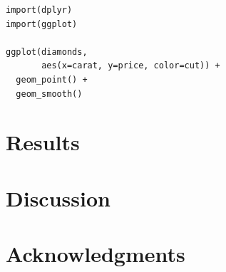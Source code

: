 \documentclass[fleqn,moreauthors,10pt]{ds_report}
\begin{document}
\lstset{language=Python}


\lstset{language=R}
\begin{lstlisting}
import(dplyr)
import(ggplot)

ggplot(diamonds,
	   aes(x=carat, y=price, color=cut)) +
  geom_point() +
  geom_smooth()
\end{lstlisting}
\fi


\section*{Results}


\section*{Discussion}



\section*{Acknowledgments}




\end{document}
